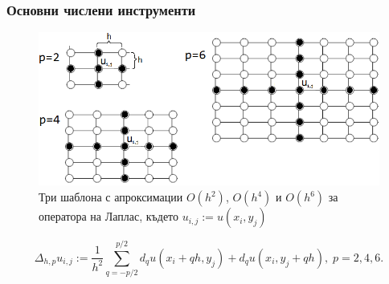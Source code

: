 \documentclass{beamer}
\begin{document}
\begin{frame}
\frametitle{Основни числени инструменти}

\begin{figure}
	\includegraphics[width=0.99\linewidth]{FDS.png}
	\caption{Три шаблона с апроксимации $O(h^2)$, $O(h^4)$ и $O(h^6)$ за оператора на Лаплас, където $u_{i,j}:=u(x_i,y_j)$ }
	\label{fig:aproxLap}
\end{figure}

\begin{equation}\label{fdx}
\Delta_{h,p}u_{i,j} :=  \frac{1}{h^2} \sum\limits_{q=-p/2}^{p/2} d_q u(x_i+qh, y_j)+d_q u(x_i, y_j+qh), \; p=2,4,6.
\end{equation}
\end{frame}

%
\end{document}
